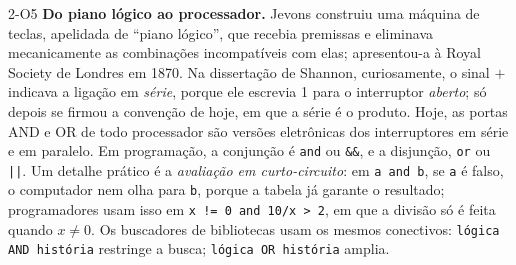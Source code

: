 \begin{obs}{2-O5}
\textbf{Do piano lógico ao processador.} Jevons construiu uma máquina de teclas, apelidada de \enquote{piano lógico}, que recebia premissas e eliminava mecanicamente as combinações incompatíveis com elas; apresentou-a à Royal Society de Londres em 1870. Na dissertação de Shannon, curiosamente, o sinal $+$ indicava a ligação em \emph{série}, porque ele escrevia 1 para o interruptor \emph{aberto}; só depois se firmou a convenção de hoje, em que a série é o produto. Hoje, as portas AND e OR de todo processador são versões eletrônicas dos interruptores em série e em paralelo. Em programação, a conjunção é \texttt{and} ou \texttt{\&\&}, e a disjunção, \texttt{or} ou \texttt{||}. Um detalhe prático é a \emph{avaliação em curto-circuito}: em \texttt{a and b}, se \texttt{a} é falso, o computador nem olha para \texttt{b}, porque a tabela já garante o resultado; programadores usam isso em \texttt{x != 0 and 10/x > 2}, em que a divisão só é feita quando $x\neq0$. Os buscadores de bibliotecas usam os mesmos conectivos: \texttt{lógica AND história} restringe a busca; \texttt{lógica OR história} amplia.
\end{obs}

\Exemplos

